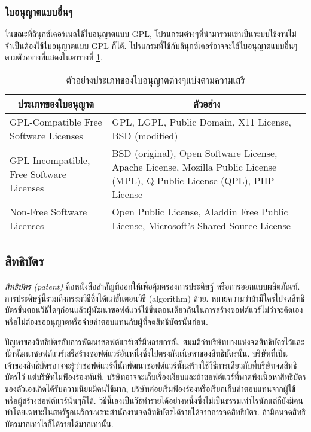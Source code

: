 \begin{thwbr}
{%
\subsubsection{ใบอนุญาตแบบอื่นๆ}

ในขณะที่ลินุกซ์เคอร์เนลใช้ใบอนุญาตแบบ GPL, โปรแกรมต่างๆที่นำมารวมเข้าเป็นระบบใช้งานไม่จำเป็นต้องใช้ใบอนุญาตแบบ GPL ก็ได้. โปรแกรมที่ใช้กับลินุกซ์เคอร์อาจจะใช้ใบอนุญาตแบบอื่นๆ \cite{license} ตามตัวอย่างที่แสดงในตารางที่ \ref{tab:license}.

\begin{table}
\center
\caption{ตัวอย่างประเภทของใบอนุญาตต่างๆแบ่งตามความเสรี}
\medskip
\label{tab:license}
\begin{tabular}{p{.4\linewidth}p{.5\linewidth}}
\hline
\multicolumn{1}{c}{ประเภทของใบอนุญาต} &  \multicolumn{1}{c}{ตัวอย่าง}\\
\hline
GPL-Compatible Free Software Licenses & GPL, LGPL, Public Domain, X11 License, BSD (modified)\\
GPL-Incompatible, Free Software Licenses & BSD (original), Open Software License, Apache License, Mozilla Public License (MPL), Q Public License (QPL), PHP License\\
Non-Free Software Licenses & Open Public License, Aladdin Free Public License, Microsoft's Shared Source License\\
\hline
\end{tabular}
\end{table}

\subsection{สิทธิบัตร}
{\em สิทธิบัตร (patent)} คือหนังสือสำคัญที่ออกให้เพื่อคุ้มครองการประดิษฐ์ หรือการออกแบบผลิตภัณฑ์. การประดิษฐ์นี้รวมถึงกรรมวิธีซึ่งได้แก่ขั้นตอนวิธี (algorithm) ด้วย. หมายความว่าถ้ามีใครไปจดสิทธิบัตรขั้นตอนวิธีใดๆก่อนแล้วผู้พัฒนาซอฟต์แวร์ใช้ขั้นตอนเดียวกันในการสร้างซอฟต์แวร์ไม่ว่าจะคิดเองหรือไม่ต้องขออนุญาตหรือจ่ายค่าตอบแทนกับผู้ที่จดสิทธิบัตรนั้นก่อน. 

ปัญหาของสิทธิบัตรกับการพัฒนาซอฟต์แวร์เสรีมีหลายกรณี. สมมติว่าบริษัทบางแห่งจดสิทธิบัตรไว้และนักพัฒนาซอฟต์แวร์เสรีสร้างซอฟต์แวร์อันหนึ่งซึ่งไปตรงกันเนื้อหาของสิทธิบัตรนั้น. บริษัทที่เป็นเจ้าของสิทธิบัตรอาจจะรู้ว่าซอฟต์แวร์ที่นักพัฒนาซอฟต์แวร์นั้นสร้างใช้วิธีการเดียวกับที่บริษัทจดสิทธิบัตรไว้ แต่บริษัทไม่ฟ้องร้องทันที. บริษัทอาจจะเก็บเรื่องเงียบและถ้าซอฟต์แวร์ที่พาดพิงเนื้อหาสิทธิบัตรของตัวเองเกิดได้รับความนิยมมีคนใช้มาก, บริษัทค่อยเริ่มฟ้องร้องหรือเรียกเก็บค่าตอบแทนจากผู้ใช้หรือผู้สร้างซอฟต์แวร์นั้นๆก็ได้. วิธีนี้เองเป็นวิธีทำรายได้อย่างหนึ่งซึ่งไม่เป็นธรรมเท่าไรนักแต่ก็ยังมีคนทำโดยเฉพาะในสหรัฐอเมริกาเพราะสำนักงานจดสิทธิบัตรได้รายได้จากการจดสิทธิบัตร. ถ้ามีคนจดสิทธิบัตรมากเท่าไรก็ได้รายได้มากเท่านั้น. 

}
\end{thwbr}
